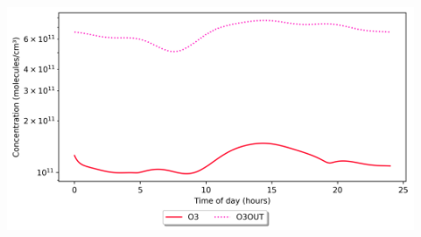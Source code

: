 \documentclass[a4paper]{refart}
\begin{document}
{\begin{minipage}{\fullwidth}
\begin{enumerate}
            \vspace{1em}
            \begin{minipage}[t]{\linewidth}
                \centering
                \includegraphics[width = 0.9\textwidth]{example_out.png}
            \end{minipage}

\end{enumerate}
\end{minipage}}
\end{document}
